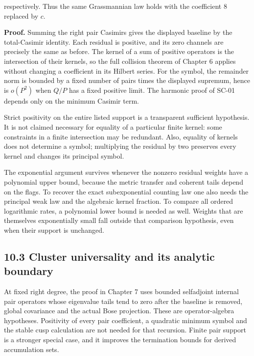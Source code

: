 respectively. Thus the same Grassmannian law holds with the coefficient \(8\) replaced by \(c\).

\textbf{Proof.} Summing the right pair Casimirs gives the displayed baseline by the total-Casimir identity. Each residual is positive, and its zero channels are precisely the same as before. The kernel of a sum of positive operators is the intersection of their kernels, so the full collision theorem of Chapter 6 applies without changing a coefficient in its Hilbert series. For the symbol, the remainder norm is bounded by a fixed number of pairs times the displayed supremum, hence is \(o(P^2)\) when \(Q/P\) has a fixed positive limit. The harmonic proof of SC-01 depends only on the minimum Casimir term.

Strict positivity on the entire listed support is a transparent sufficient hypothesis. It is not claimed necessary for equality of a particular finite kernel: some constraints in a finite intersection may be redundant. Also, equality of kernels does not determine a symbol; multiplying the residual by two preserves every kernel and changes its principal symbol.

The exponential argument survives whenever the nonzero residual weights have a polynomial upper bound, because the metric transfer and coherent tails depend on the flags. To recover the exact subexponential counting law one also needs the principal weak law and the algebraic kernel fraction. To compare all ordered logarithmic rates, a polynomial lower bound is needed as well. Weights that are themselves exponentially small fall outside that comparison hypothesis, even when their support is unchanged.

\hypertarget{cluster-universality-and-its-analytic-boundary}{%
\subsection{10.3 Cluster universality and its analytic boundary}\label{cluster-universality-and-its-analytic-boundary}}

At fixed right degree, the proof in Chapter 7 uses bounded selfadjoint internal pair operators whose eigenvalue tails tend to zero after the baseline is removed, global covariance and the actual Bose projection. These are operator-algebra hypotheses. Positivity of every pair coefficient, a quadratic minimum symbol and the stable cusp calculation are not needed for that recursion. Finite pair support is a stronger special case, and it improves the termination bounds for derived accumulation sets.

